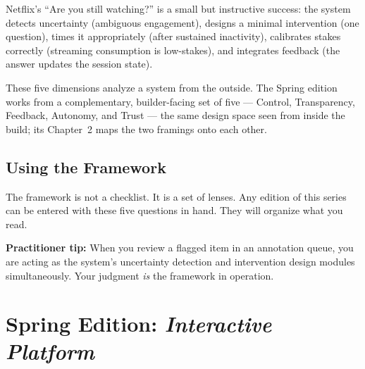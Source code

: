 \documentclass[12pt, a4paper]{article}
\begin{document}
Netflix's ``Are you still watching?'' is a small but instructive success: the system detects uncertainty (ambiguous engagement), designs a minimal intervention (one question), times it appropriately (after sustained inactivity), calibrates stakes correctly (streaming consumption is low-stakes), and integrates feedback (the answer updates the session state).

These five dimensions analyze a system from the outside. The Spring edition works from a complementary, builder-facing set of five --- Control, Transparency, Feedback, Autonomy, and Trust --- the same design space seen from inside the build; its Chapter~2 maps the two framings onto each other.

\subsection{Using the Framework}

The framework is not a checklist. It is a set of lenses. Any edition of this series can be entered with these five questions in hand. They will organize what you read.

\begin{tcolorbox}[amberstyle]
\textbf{Practitioner tip:} When you review a flagged item in an annotation queue, you are acting as the system's uncertainty detection and intervention design modules simultaneously. Your judgment \textit{is} the framework in operation.
\end{tcolorbox}

\newpage

\section{Spring Edition: \textit{Interactive Platform}}
\end{document}
